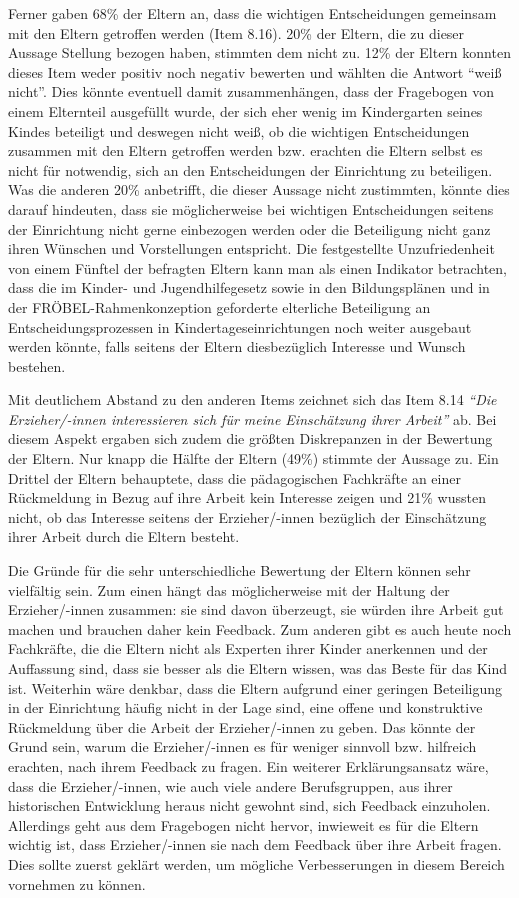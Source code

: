 \documentclass[12pt,a4paper]{article}
\begin{document}
	Ferner gaben 68\% der Eltern an, dass die wichtigen Entscheidungen gemeinsam mit den Eltern getroffen werden (Item 8.16). 20\% der Eltern, die zu dieser Aussage Stellung bezogen haben, stimmten dem nicht zu. 12\% der Eltern konnten dieses Item weder positiv noch negativ bewerten und wählten die Antwort "`weiß nicht"'. Dies könnte eventuell damit zusammenhängen, dass der Fragebogen von einem Elternteil ausgefüllt wurde, der sich eher wenig im Kindergarten seines Kindes beteiligt und deswegen nicht weiß, ob die wichtigen Entscheidungen zusammen mit den Eltern getroffen werden bzw. erachten die Eltern selbst es nicht für notwendig, sich an den Entscheidungen der Einrichtung zu beteiligen. Was die anderen 20\% anbetrifft, die dieser Aussage nicht zustimmten, könnte dies darauf hindeuten, dass sie möglicherweise bei wichtigen Entscheidungen seitens der Einrichtung nicht gerne einbezogen werden oder die Beteiligung nicht ganz ihren Wünschen und Vorstellungen entspricht. Die festgestellte Unzufriedenheit von einem Fünftel der befragten Eltern kann man als einen Indikator betrachten, dass die im Kinder- und Jugendhilfegesetz sowie in den Bildungsplänen und in der FRÖBEL-Rahmenkonzeption geforderte elterliche Beteiligung an Entscheidungsprozessen in Kindertageseinrichtungen noch weiter ausgebaut werden könnte, falls seitens der Eltern diesbezüglich Interesse und Wunsch bestehen.
	
	Mit deutlichem Abstand zu den anderen Items zeichnet sich das Item 8.14 \textit{"`Die Erzieher/-innen interessieren sich für meine Einschätzung ihrer Arbeit"'} ab. Bei diesem Aspekt ergaben sich zudem die größten Diskrepanzen in der Bewertung der Eltern. Nur knapp die Hälfte der Eltern (49\%) stimmte der Aussage zu. Ein Drittel der Eltern behauptete, dass die pädagogischen Fachkräfte an einer Rückmeldung in Bezug auf ihre Arbeit kein Interesse zeigen und 21\% wussten nicht, ob das Interesse seitens der Erzieher/-innen bezüglich der Einschätzung ihrer Arbeit durch die Eltern besteht. 
	
Die Gründe für die sehr unterschiedliche Bewertung der Eltern können sehr vielfältig sein. Zum einen hängt das möglicherweise mit der Haltung der Erzieher/-innen zusammen: sie sind davon überzeugt, sie würden ihre Arbeit gut machen und brauchen daher kein Feedback. Zum anderen gibt es auch heute noch Fachkräfte, die die Eltern nicht als Experten ihrer Kinder anerkennen und der Auffassung sind, dass sie besser als die Eltern wissen, was das Beste für das Kind ist. Weiterhin wäre denkbar, dass die Eltern aufgrund einer geringen Beteiligung in der Einrichtung häufig nicht in der Lage sind, eine offene und konstruktive Rückmeldung über die Arbeit der Erzieher/-innen zu geben. Das könnte der Grund sein, warum die Erzieher/-innen es für weniger sinnvoll bzw. hilfreich erachten, nach ihrem Feedback zu fragen. Ein weiterer Erklärungsansatz wäre, dass die Erzieher/-innen, wie auch viele andere Berufsgruppen, aus ihrer historischen Entwicklung heraus nicht gewohnt sind, sich Feedback einzuholen. Allerdings geht aus dem Fragebogen nicht hervor, inwieweit es für die Eltern wichtig ist, dass Erzieher/-innen sie nach dem Feedback über ihre Arbeit fragen. Dies sollte zuerst geklärt werden, um mögliche Verbesserungen in diesem Bereich vornehmen zu können.
\end{document}
